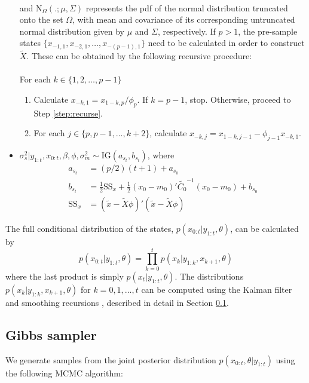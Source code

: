 \documentclass{article}
\begin{document}
\begin{itemize}
\begin{align*}
\end{align*}
\noindent and $\mbox{N}_{\Omega}(.;\mu,\Sigma)$ represents the pdf of the normal distribution truncated onto the set $\Omega$, with mean and covariance of its corresponding untruncated normal distribution given by $\mu$ and $\Sigma$, respectively. If $p > 1$, the pre-sample states $\{x_{-1,1}, x_{-2,1}, \ldots, x_{-(p-1),1}\}$ need to be calculated in order to construct $\tilde{X}$. These can be obtained by the following recursive procedure: \\
\\
For each $k \in \{1,2,\ldots,p-1\}$
\begin{enumerate}
\item Calculate $x_{-k,1} = x_{1-k,p} / \phi_p$. If $k = p - 1$, stop. Otherwise, proceed to Step \ref{step:recurse}.
\item For each $j \in \{p,p-1,\ldots,k+2\}$, calculate $x_{-k,j} = x_{1-k,j-1} - \phi_{j-1}x_{-k,1}$. \label{step:recurse}
\end{enumerate}
\item $\sigma^2_s|y_{1:t},x_{0:t},\beta,\phi,\sigma^2_m \sim \mbox{IG}(a_{s_t}, b_{s_t})$, where
\begin{align*}
a_{s_t} &= (p/2)(t+1) + a_{s_0} \\
b_{s_t} &= \frac{1}{2}\mbox{SS}_x + \frac{1}{2}(x_0-m_0)'\tilde{C_0}^{-1}(x_0-m_0) + b_{s_0} \\
\mbox{SS}_x &= (\tilde{x} - \tilde{X}\phi)'(\tilde{x} - \tilde{X}\phi)
\end{align*}
\end{itemize}

The full conditional distribution of the states, $p(x_{0:t}|y_{1:t},\theta)$, can be calculated by
\[p(x_{0:t}|y_{1:t},\theta) = \prod_{k=0}^t p(x_k|y_{1:k},x_{k+1},\theta)\]
where the last product is simply $p(x_t|y_{1:t},\theta)$. The distributions $p(x_k|y_{1:k},x_{k+1},\theta)$ for $k = 0,1,\ldots,t$ can be computed using the Kalman filter and smoothing recursions \citep{petris2009dynamic}, described in detail in Section \ref{sec:gibbs}.

\subsection{Gibbs sampler} \label{sec:gibbs}

We generate samples from the joint posterior distribution $p(x_{0:t},\theta|y_{1:t})$ using the following MCMC algorithm:
\end{document}

